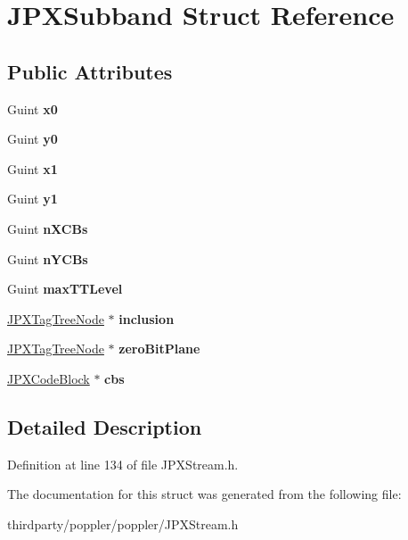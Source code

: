 \hypertarget{struct_j_p_x_subband}{}\section{J\+P\+X\+Subband Struct Reference}
\label{struct_j_p_x_subband}
\subsection*{Public Attributes}
\begin{DoxyCompactItemize}
\item 
\mbox{\label{struct_j_p_x_subband_ae7a8fa5aa950968b7902505d0f7de859}} 
Guint {\bfseries x0}
\item 
\mbox{\label{struct_j_p_x_subband_ac5c95fb4ec25961246d551ca74755b90}} 
Guint {\bfseries y0}
\item 
\mbox{\label{struct_j_p_x_subband_a981fa385c58f0658573c94bbbe22598c}} 
Guint {\bfseries x1}
\item 
\mbox{\label{struct_j_p_x_subband_afcb53b43c1263468d46505b41e72297f}} 
Guint {\bfseries y1}
\item 
\mbox{\label{struct_j_p_x_subband_af9daa68dc57c1e00a9168c1f630afb09}} 
Guint {\bfseries n\+X\+C\+Bs}
\item 
\mbox{\label{struct_j_p_x_subband_a8309d4fca35e5b914522c2dbc3324933}} 
Guint {\bfseries n\+Y\+C\+Bs}
\item 
\mbox{\label{struct_j_p_x_subband_abfe5be660cb9292906c6cf87c6a63434}} 
Guint {\bfseries max\+T\+T\+Level}
\item 
\mbox{\label{struct_j_p_x_subband_aab55c7ca91d067805b91aee931ed1b4f}} 
\hyperlink{struct_j_p_x_tag_tree_node}{J\+P\+X\+Tag\+Tree\+Node} $\ast$ {\bfseries inclusion}
\item 
\mbox{\label{struct_j_p_x_subband_a21fec5a55fbb9a222be30d5707ceaa40}} 
\hyperlink{struct_j_p_x_tag_tree_node}{J\+P\+X\+Tag\+Tree\+Node} $\ast$ {\bfseries zero\+Bit\+Plane}
\item 
\mbox{\label{struct_j_p_x_subband_a8d486745e426b8789a4dd1dc9c29f25f}} 
\hyperlink{struct_j_p_x_code_block}{J\+P\+X\+Code\+Block} $\ast$ {\bfseries cbs}
\end{DoxyCompactItemize}


\subsection{Detailed Description}


Definition at line 134 of file J\+P\+X\+Stream.\+h.



The documentation for this struct was generated from the following file\+:\begin{DoxyCompactItemize}
\item 
thirdparty/poppler/poppler/J\+P\+X\+Stream.\+h\end{DoxyCompactItemize}

